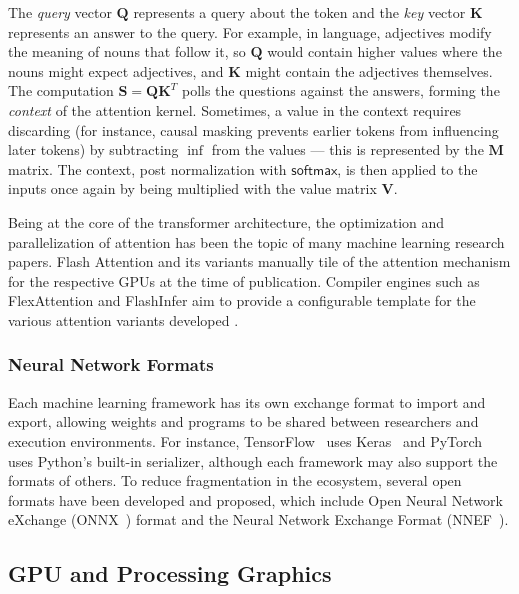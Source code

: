 \documentclass[review, acmsmall, nonacm]{acmart}
\newcommand{\softmax}{\mathsf{softmax}}
\begin{document}
The \emph{query} vector $\mathbf{Q}$ represents a query about the token and the \emph{key} vector $\mathbf{K}$ represents an answer to the query. For example, in language, adjectives modify the meaning of nouns that follow it, so $\mathbf{Q}$ would contain higher values where the nouns might expect adjectives, and $\mathbf{K}$ might contain the adjectives themselves. The computation $\mathbf{S}=\mathbf{Q}\mathbf{K}^T$ polls the questions against the answers, forming the \emph{context} of the attention kernel. Sometimes, a value in the context requires discarding (for instance, causal masking prevents earlier tokens from influencing later tokens) by subtracting $\inf$ from the values --- this is represented by the $\mathbf{M}$ matrix. The context, post normalization with $\softmax$, is then applied to the inputs once again by being multiplied with the value matrix $\mathbf{V}$.

Being at the core of the transformer architecture, the optimization and parallelization of attention has been the topic of many machine learning research papers. Flash Attention and its variants \cite{daoFlashAttentionFastMemoryEfficient2022,daoFlashAttention2FasterAttention2023} manually tile of the attention mechanism for the respective GPUs at the time of publication. Compiler engines such as FlexAttention \cite{dongFlexAttentionProgramming2024} and FlashInfer \cite{yeFlashInferEfficientCustomizable2025} aim to provide a configurable template for the various attention variants developed \cite{liuRingAttentionBlockwise2023,brandonStripedAttentionFaster2023,kwon2023efficient}.

\subsubsection{Neural Network Formats} Each machine learning framework has its own exchange format to import and export, allowing weights and programs to be shared between researchers and execution environments. For instance, TensorFlow~\cite{tensorflow2015-whitepaper} uses Keras~\cite{chollet2015keras} and PyTorch~\cite{paszkePyTorchImperativeStyle2019} uses Python's built-in serializer, although each framework may also support the formats of others. To reduce fragmentation in the ecosystem, several open formats have been developed and proposed, which include Open Neural Network eXchange (ONNX~\cite{onnxruntime}) format and the Neural Network Exchange Format (NNEF~\cite{khronosNNEFNeuralNetwork2016}).

\subsection{GPU and Processing Graphics}
\end{document}
